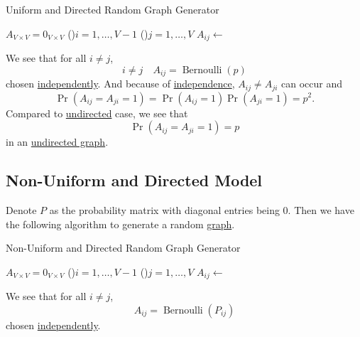 \begin{algorithm}[H]\label{algo:uniform-and-directed-model-algo}
	\DontPrintSemicolon{}
	\caption{Uniform and Directed Random Graph Generator}
	\BlankLine

	\(A_{V\times V} = 0_{V \times V}\) 
	\;
	\For(){\(i= 1, \dots  , V-1\)}{
		\For(){\(j=1, \dots  , V\)}{
			\(A_{ij} \gets \)
		}
	}
	\;
\end{algorithm}

We see that for all \(i \neq j\),
\[
	i\neq j\quad A_{ij}= \operatorname{Bernoulli}(p)
\]
chosen \hyperref[def:independent]{independently}. And because of \hyperref[def:independent]{independence},
\(A_{ij}\neq A_{ji}\) can occur and
\[
	\Pr(A_{ij} = A_{ji} = 1) = \Pr(A_{ij} = 1) \Pr( A_{ji} = 1) = p^2.
\]
Compared to \hyperref[subsec:Uniform-and-Undirected-model]{undirected} case, we see that
\[
	\Pr(A_{ij} = A_{ji} = 1) = p
\]
in an \hyperref[def:undirected-graph]{undirected graph}.

\subsection{Non-Uniform and Directed Model}\label{subsec:non-uniform-and-directed-model}
Denote \(P\) as the probability matrix with diagonal entries being \(0\). Then we have the following algorithm to generate a random \hyperref[def:graph]{graph}.

\begin{algorithm}[H]\label{algo:non-uniform-and-directed-model-algo}
	\DontPrintSemicolon{}
	\caption{Non-Uniform and Directed Random Graph Generator}
	\BlankLine

	\(A_{V\times V} = 0_{V \times V}\) 
	\;
	\For(){\(i= 1, \dots  , V-1\)}{
	\For(){\(j= 1, \dots  , V\)}{
	\(A_{ij} \gets \)
	}
	}
	\;
\end{algorithm}

We see that for all \(i\neq j\),
\[
	A_{ij} = \operatorname{Bernoulli}(P_{ij})
\]
chosen \hyperref[def:independent]{independently}.

